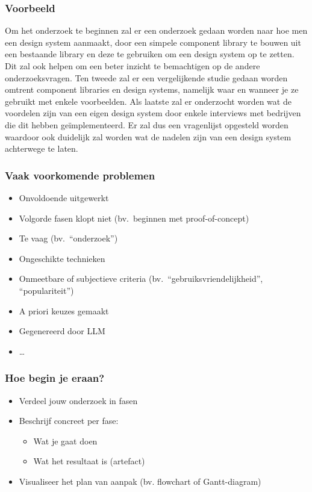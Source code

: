\documentclass[aspectratio=169]{beamer}
\begin{document}
\begin{frame}
  \frametitle{Voorbeeld}

  \small

  Om het onderzoek te beginnen zal er een onderzoek gedaan worden naar hoe men een design system aanmaakt, door een simpele component library te bouwen uit een bestaande library en deze te gebruiken om een design system op te zetten. Dit zal ook helpen om een beter inzicht te bemachtigen op de andere onderzoeksvragen. Ten tweede zal er een vergelijkende studie gedaan worden omtrent component libraries en design systems, namelijk waar en wanneer je ze gebruikt met enkele voorbeelden. Als laatste zal er onderzocht worden wat de voordelen zijn van een eigen design system door enkele interviews met bedrijven die dit hebben geïmplementeerd. Er zal dus een vragenlijst opgesteld worden waardoor ook duidelijk zal worden wat de nadelen zijn van een design system achterwege te laten.

\end{frame}

\begin{frame}
  \frametitle{Vaak voorkomende problemen}

  \begin{itemize}
    \item Onvoldoende uitgewerkt
    \item Volgorde fasen klopt niet (bv.\ beginnen met proof-of-concept)
    \item Te vaag (bv.\ ``onderzoek'')
    \item Ongeschikte technieken
    \item Onmeetbare of subjectieve criteria (bv.\ ``gebruiksvriendelijkheid'', ``populariteit'')
    \item A priori keuzes gemaakt
    \item Gegenereerd door LLM
    \item \ldots
  \end{itemize}

\end{frame}

\begin{frame}
  \frametitle{Hoe begin je eraan?}

  \begin{itemize}
    \item Verdeel jouw onderzoek in fasen
    \item Beschrijf concreet per fase:
          \begin{itemize}
            \item Wat je gaat doen
            \item Wat het resultaat is (artefact)
          \end{itemize}
    \item Visualiseer het plan van aanpak (bv. flowchart of Gantt-diagram)
  \end{itemize}
\end{frame}
\end{document}
